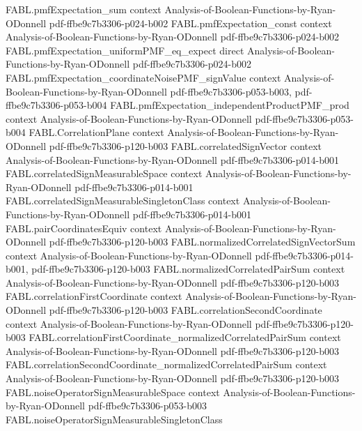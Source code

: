 \begin{theorem}
\proofstep
  {FABL.pmfExpectation_sum}
  {context}
  {Analysis-of-Boolean-Functions-by-Ryan-ODonnell}
  {pdf-ffbe9c7b3306-p024-b002}
\proofstep
  {FABL.pmfExpectation_const}
  {context}
  {Analysis-of-Boolean-Functions-by-Ryan-ODonnell}
  {pdf-ffbe9c7b3306-p024-b002}
\proofstep
  {FABL.pmfExpectation_uniformPMF_eq_expect}
  {direct}
  {Analysis-of-Boolean-Functions-by-Ryan-ODonnell}
  {pdf-ffbe9c7b3306-p024-b002}
\proofstep
  {FABL.pmfExpectation_coordinateNoisePMF_signValue}
  {context}
  {Analysis-of-Boolean-Functions-by-Ryan-ODonnell}
  {pdf-ffbe9c7b3306-p053-b003,
    pdf-ffbe9c7b3306-p053-b004}
\proofstep
  {FABL.pmfExpectation_independentProductPMF_prod}
  {context}
  {Analysis-of-Boolean-Functions-by-Ryan-ODonnell}
  {pdf-ffbe9c7b3306-p053-b004}
\proofstep
  {FABL.CorrelationPlane}
  {context}
  {Analysis-of-Boolean-Functions-by-Ryan-ODonnell}
  {pdf-ffbe9c7b3306-p120-b003}
\proofstep
  {FABL.correlatedSignVector}
  {context}
  {Analysis-of-Boolean-Functions-by-Ryan-ODonnell}
  {pdf-ffbe9c7b3306-p014-b001}
\proofstep
  {FABL.correlatedSignMeasurableSpace}
  {context}
  {Analysis-of-Boolean-Functions-by-Ryan-ODonnell}
  {pdf-ffbe9c7b3306-p014-b001}
\proofstep
  {FABL.correlatedSignMeasurableSingletonClass}
  {context}
  {Analysis-of-Boolean-Functions-by-Ryan-ODonnell}
  {pdf-ffbe9c7b3306-p014-b001}
\proofstep
  {FABL.pairCoordinatesEquiv}
  {context}
  {Analysis-of-Boolean-Functions-by-Ryan-ODonnell}
  {pdf-ffbe9c7b3306-p120-b003}
\proofstep
  {FABL.normalizedCorrelatedSignVectorSum}
  {context}
  {Analysis-of-Boolean-Functions-by-Ryan-ODonnell}
  {pdf-ffbe9c7b3306-p014-b001,
    pdf-ffbe9c7b3306-p120-b003}
\proofstep
  {FABL.normalizedCorrelatedPairSum}
  {context}
  {Analysis-of-Boolean-Functions-by-Ryan-ODonnell}
  {pdf-ffbe9c7b3306-p120-b003}
\proofstep
  {FABL.correlationFirstCoordinate}
  {context}
  {Analysis-of-Boolean-Functions-by-Ryan-ODonnell}
  {pdf-ffbe9c7b3306-p120-b003}
\proofstep
  {FABL.correlationSecondCoordinate}
  {context}
  {Analysis-of-Boolean-Functions-by-Ryan-ODonnell}
  {pdf-ffbe9c7b3306-p120-b003}
\proofstep
  {FABL.correlationFirstCoordinate_normalizedCorrelatedPairSum}
  {context}
  {Analysis-of-Boolean-Functions-by-Ryan-ODonnell}
  {pdf-ffbe9c7b3306-p120-b003}
\proofstep
  {FABL.correlationSecondCoordinate_normalizedCorrelatedPairSum}
  {context}
  {Analysis-of-Boolean-Functions-by-Ryan-ODonnell}
  {pdf-ffbe9c7b3306-p120-b003}
\proofstep
  {FABL.noiseOperatorSignMeasurableSpace}
  {context}
  {Analysis-of-Boolean-Functions-by-Ryan-ODonnell}
  {pdf-ffbe9c7b3306-p053-b003}
\proofstep
  {FABL.noiseOperatorSignMeasurableSingletonClass}

\end{theorem}
